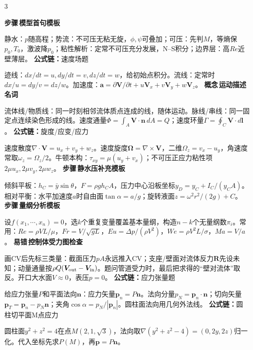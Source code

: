 \documentclass[a4paper]{article}
\newcommand{\form}[1]{{\color{M}\bfseries 公式链：}#1\par}
\newcommand{\labtag}[3]{{\bfseries\color{#1}\colorbox{#1}{\color{white}\fontsize{2.35}{2.48}\selectfont #2}\,#3}\par}
\newcommand{\step}[1]{\labtag{S}{步骤}{#1}}
\newcommand{\err}[1]{\labtag{R}{易错}{#1}}
\newcommand{\concept}[1]{\labtag{V}{概念}{#1}}
\newcommand{\stepq}[1]{\step{#1}}
\newcommand{\formq}[1]{\form{#1}}
\newcommand{\errq}[1]{\err{#1}}
\newcommand{\conceptq}[1]{\concept{#1}}
\newenvironment{vfourWrap}{\par\begingroup\fontsize{2.68}{2.84}\selectfont\setlength{\fboxsep}{0.45pt}}{\par\endgroup}
\begin{document}
\begin{multicols}{3}
\begin{vfourWrap}
\stepq{模型首句模板}
静水：$p$随高程；势流：不可压无粘无旋，$\phi,\psi$可叠加；可压：先判$M$，等熵保$p_0,T_0$，激波降$p_0$；粘性解析：定常不可压充分发展，N--S积分；边界层：高$Re$近壁薄层。
\formq{速度场题}
迹线：$dx/dt=u,dy/dt=v,dz/dt=w$，给初始点积分。流线：定常时$dx/u=dy/v=dz/w$。加速度：$\bm a=\partial\bm V/\partial t+u\bm V_x+v\bm V_y+w\bm V_z$。
\conceptq{运动描述名词}
流体线/物质线：同一时刻相邻流体质点连成的线，随体运动。脉线/串线：同一固定点连续染色形成的线。速度通量$\Phi=\int_A\bm V\cdot\bm n\,dA=Q$；速度环量$\Gamma=\oint_C\bm V\cdot d\bm l$。
\formq{旋度/应变/应力}
速度散度$\nabla\cdot\bm V=u_x+v_y+w_z$。速度旋度$\bm\Omega=\nabla\times\bm V$，二维$\Omega_z=v_x-u_y$，角速度常取$\omega_z=\Omega_z/2$。牛顿本构：$\tau_{xy}=\mu(u_y+v_x)$；不可压正应力粘性项$2\mu u_x,2\mu v_y,2\mu w_z$。
\stepq{静水压补充模板}
倾斜平板：$h_C=\bar y\sin\theta$，$F=\rho gh_CA$，压力中心沿板坐标$y_D=y_C+I_C/(y_CA)$。相对平衡：水平加速度$a$时自由面$\tan\alpha=a/g$；旋转液面$z=\omega^2r^2/(2g)+C$。
\stepq{量纲分析模板}
设$f(x_1,\cdots,x_n)=0$，选$k$个重复变量覆盖基本量纲，构造$n-k$个无量纲数$\pi_i$。常用：$Re=\rho VL/\mu$，$Fr=V/\sqrt{gL}$，$Eu=\Delta p/(\rho V^2)$，$We=\rho V^2L/\sigma$，$Ma=V/a$。
\errq{控制体受力图检查}
画CV后先标三类量：截面压力$pA$永远推入CV；支座/壁面对流体反力$\bm R$先设未知；动量通量按$\rho Q(\bm V_{\rm out}-\bm V_{\rm in})$。题问管道受力时，最后把求得的“壁对流体”取反。开口大水面$V\approx0$，表压$p=0$。
\formq{应力张量题}
给应力张量$P$和平面法向$\bm n$：应力矢量$\bm p_n=P\bm n$。法向分量$p_N=\bm p_n\cdot\bm n$；切向矢量$\bm p_T=\bm p_n-p_N\bm n$；夹角$\cos\alpha=p_N/|\bm p_n|$。圆柱面法向用几何外法线。
\formq{圆柱切平面M点应力}
圆柱面$y^2+z^2=4$在点$M(2,1,\sqrt3)$，法向取$\nabla(y^2+z^2-4)=(0,2y,2z)$归一化。代入坐标先求$P(M)$，再$\bm p=P\bm n$。


\end{vfourWrap}
\end{multicols}
\end{document}
